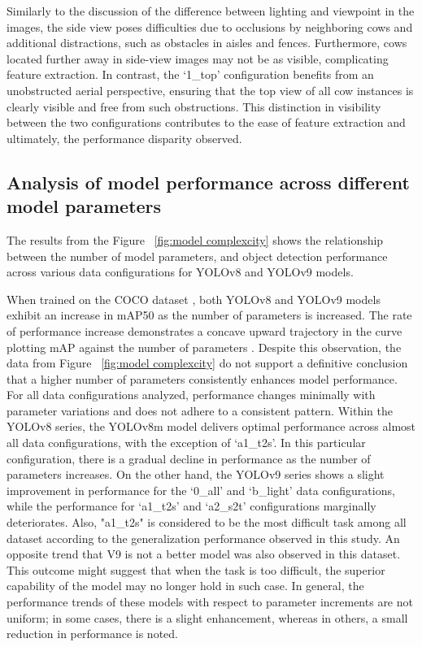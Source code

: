 Similarly to the discussion of the difference between lighting and viewpoint in the images, the side view poses difficulties due to occlusions by neighboring cows and additional distractions, such as obstacles in aisles and fences. Furthermore, cows located further away in side-view images may not be as visible, complicating feature extraction. In contrast, the `1\_top' configuration benefits from an unobstructed aerial perspective, ensuring that the top view of all cow instances is clearly visible and free from such obstructions. This distinction in visibility between the two configurations contributes to the ease of feature extraction and ultimately, the performance disparity observed. 




\subsection{Analysis of model performance across different model parameters}


The results from the Figure ~\ref{fig:model complexcity} shows the relationship between the number of model parameters, and object detection performance across various data configurations for YOLOv8 and YOLOv9 models. 

When trained on the COCO dataset \cite{lin2014microsoft}, both YOLOv8 and YOLOv9 models exhibit an increase in mAP50 as the number of parameters is increased. The rate of performance increase demonstrates a concave upward trajectory in the curve plotting mAP against the number of parameters \cite{ultralyticsYOLOv8,wang2024yolov9}. Despite this observation, the data from Figure ~\ref{fig:model complexcity} do not support a definitive conclusion that a higher number of parameters consistently enhances model performance. For all data configurations analyzed, performance changes minimally with parameter variations and does not adhere to a consistent pattern. Within the YOLOv8 series, the YOLOv8m model delivers optimal performance across almost all data configurations, with the exception of `a1\_t2s'. In this particular configuration, there is a gradual decline in performance as the number of parameters increases. On the other hand, the YOLOv9 series shows a slight improvement in performance for the `0\_all' and `b\_light' data configurations, while the performance for `a1\_t2s' and `a2\_s2t' configurations marginally deteriorates. Also, "a1\_t2s" is considered to be the most difficult task among all dataset according to the generalization performance observed in this study. An opposite trend that V9 is not a better model was also observed in this dataset. This outcome might suggest that when the task is too difficult, the superior capability of the model may no longer hold in such case. In general, the performance trends of these models with respect to parameter increments are not uniform; in some cases, there is a slight enhancement, whereas in others, a small reduction in performance is noted.

